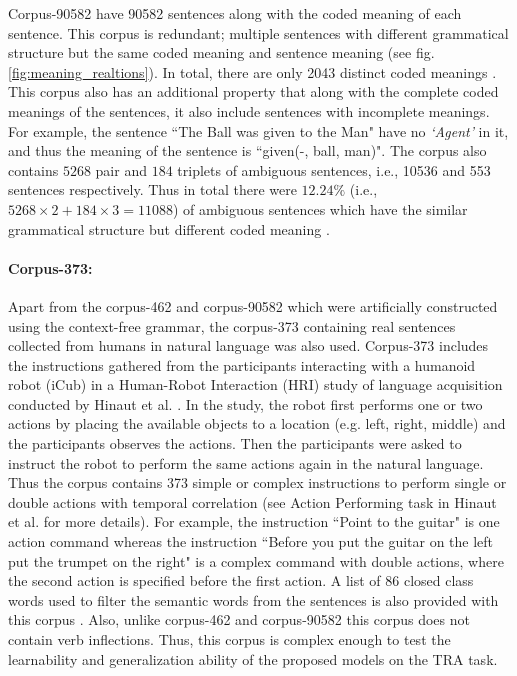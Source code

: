 Corpus-90582 have 90582 sentences along with the coded meaning of each sentence. This corpus is redundant; multiple sentences with different grammatical structure but the same coded meaning and sentence meaning (see fig. \ref{fig:meaning_realtions}). In total, there are only 2043 distinct coded meanings \cite{xavier:2013:RT}. This corpus also has an additional property that along with the complete coded meanings of the sentences, it also include sentences with incomplete meanings. For example, the sentence ``The Ball was given to the Man" have no \textit{`Agent'} in it, and thus the meaning of the sentence is ``given(-, ball, man)". The corpus also contains $5268$ pair and $184$ triplets of ambiguous sentences, i.e., 10536 and 553 sentences respectively. Thus in total there were $12.24 \%$ (i.e., $ 5268 \times 2 + 184 \times 3 = 11088 $) of ambiguous sentences which have the similar grammatical structure but different coded meaning \cite{xavier:2013:RT}.

\paragraph{Corpus-373:} Apart from the corpus-462 and corpus-90582 which were artificially constructed using the context-free grammar, the corpus-373 containing real sentences collected from humans in natural language was also used. Corpus-373 includes the instructions gathered from the participants interacting with a humanoid robot (iCub) in a Human-Robot Interaction (HRI) study of language acquisition conducted by Hinaut et al. \cite{tra:xavier_hri}. In the study, the robot first performs one or two actions by placing the available objects to a location (e.g. left, right, middle) and the participants observes the actions. Then the participants were asked to instruct the robot to perform the same actions again in the natural language. Thus the corpus contains 373 simple or complex instructions to perform single or double actions with temporal correlation (see Action Performing task in Hinaut et al. \cite{tra:xavier_hri} for more details). For example, the instruction ``Point to the guitar" is one action command whereas the instruction ``Before you put the guitar on the left put the trumpet on the right" is a complex command with double actions, where the second action is specified before the first action. A list of 86 closed class words used to filter the semantic words from the sentences is also provided with this corpus \cite{tra:xavier_hri}. Also, unlike corpus-462 and corpus-90582 this corpus does not contain verb inflections. Thus, this corpus is complex enough to test the learnability and generalization ability of the proposed models on the TRA task.

